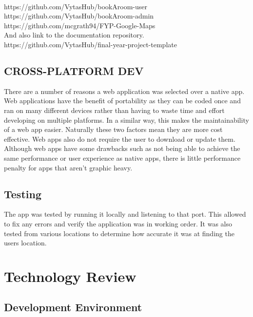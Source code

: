 \begin{itemize}
\\https://github.com/VytasHub/bookAroom-user
\\https://github.com/VytasHub/bookAroom-admin
\\https://github.com/mcgrath94/FYP-Google-Maps
\\And also link to the documentation repository.
\\https://github.com/VytasHub/final-year-project-template



\section{CROSS-PLATFORM DEV}

There are a number of reasons a web application was selected over a native app. Web applications have the benefit of portability as they can be coded once and ran on many different devices rather than having to waste time and effort developing on multiple platforms. In a similar way, this makes the maintainability of a web app easier. Naturally these two factors mean they are more cost effective. Web apps also do not require the user to download or update them. Although web apps have some drawbacks such as not being able to achieve the same performance or user experience as native apps, there is little performance penalty for apps that aren't graphic heavy. 

\section{Testing}

The app was tested by running it locally and listening to that port. This allowed to fix any errors and verify the application was in working order. It was also tested from various locations to determine how accurate it was at finding the users location.




\chapter{Technology Review}
\section{Development Environment}


\end{itemize}
